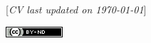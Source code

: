 \documentclass[letterpaper,MMMyyyy,nonstopmode]{simpleresumecv}
\newcommand{\CVNote}{CV last updated on {\today}}
\newcommand{\Code}[1]{\mbox{\textbf{#1}}}
\newcommand{\CodeCommand}[1]{\mbox{\textbf{\textbackslash{#1}}}}
\begin{document}
\begin{Body}




\end{Body}


\UseNoteFont%
\null\hfill%
[\textit{\CVNote}]

\null\hfill%
\href{https://creativecommons.org/licenses/by-nd/4.0/}{\includegraphics{CC-BY-ND-small}}
\end{document}
